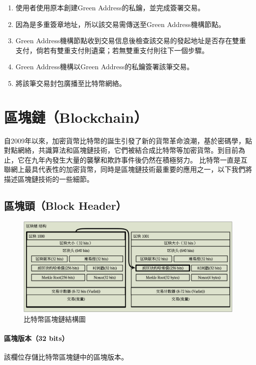 			\begin{enumerate}
				\item 使用者使用原本創建Green Address的私鑰，並完成簽署交易。
				\item 因為是多重簽章地址，所以該交易需傳送至Green Address機構節點。
				\item Green Address機構節點收到交易信息後檢查該交易的發起地址是否存在雙重支付，倘若有雙重支付則遺棄；若無雙重支付則往下一個步驟。
				\item Green Address機構以Green Address的私鑰簽署該筆交易。
				\item 將該筆交易封包廣播至比特幣網絡。
			\end{enumerate}

	\section{區塊鏈（Blockchain）}
	自2009年以來，加密貨幣比特幣的誕生引發了新的貨幣革命浪潮，基於密碼學，點對點網絡，共識算法和區塊鏈技術，它們被結合成比特幣等加密貨幣。到目前為止，它在九年內發生大量的襲擊和欺詐事件後仍然在積極努力。 比特幣一直是互聯網上最具代表性的加密貨幣，同時是區塊鏈技術最重要的應用之一，以下我們將描述區塊鏈技術的一些細節。

		\subsection{區塊頭（Block Header）}

		\begin{figure}[h]
			\centering
			\includegraphics[width = 1\textwidth]{blockchain.png}
			\caption{比特幣區塊鏈結構圖}\label{blockchain}
		\end{figure}

			\paragraph{區塊版本（32 bits）}該欄位存儲比特幣區塊鏈中的區塊版本。
